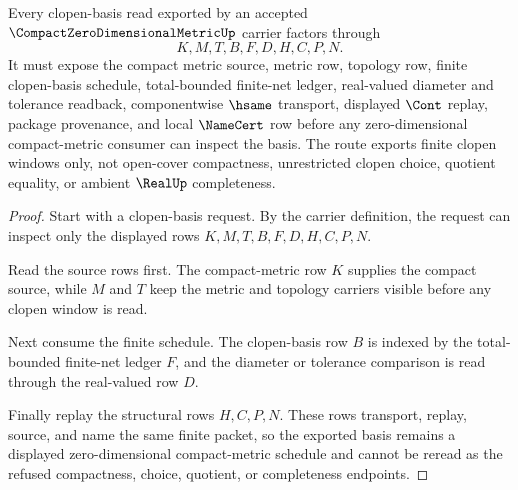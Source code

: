 \begin{theorem}
\label{thm:compact-zero-dimensional-metric-clopen-basis-route}
Every clopen-basis read exported by an accepted $\CompactZeroDimensionalMetricUp$ carrier factors through
$$
K,M,T,B,F,D,H,C,P,N .
$$
It must expose the compact metric source, metric row, topology row, finite clopen-basis schedule, total-bounded finite-net ledger, real-valued diameter and tolerance readback, componentwise $\hsame$ transport, displayed $\Cont$ replay, package provenance, and local $\NameCert$ row before any zero-dimensional compact-metric consumer can inspect the basis. The route exports finite clopen windows only, not open-cover compactness, unrestricted clopen choice, quotient equality, or ambient $\RealUp$ completeness.
\end{theorem}
\begin{proof}
Start with a clopen-basis request. By the carrier definition, the request can inspect only the displayed rows $K,M,T,B,F,D,H,C,P,N$.

Read the source rows first. The compact-metric row $K$ supplies the compact source, while $M$ and $T$ keep the metric and topology carriers visible before any clopen window is read.

Next consume the finite schedule. The clopen-basis row $B$ is indexed by the total-bounded finite-net ledger $F$, and the diameter or tolerance comparison is read through the real-valued row $D$.

Finally replay the structural rows $H,C,P,N$. These rows transport, replay, source, and name the same finite packet, so the exported basis remains a displayed zero-dimensional compact-metric schedule and cannot be reread as the refused compactness, choice, quotient, or completeness endpoints.
\end{proof}


\begin{closurestatus}{\CompactZeroDimensionalMetricUp}
  \theoryclosure{\seedClosure}
  \formalstatus{\unformalizedV}
\end{closurestatus}
